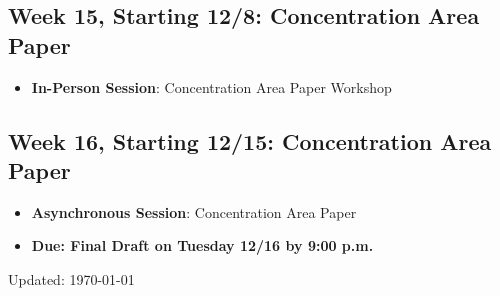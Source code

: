 \documentclass[12pt]{article}     %
\begin{document}
\subsection*{Week 15, Starting 12/8: Concentration Area Paper}
\begin{itemize}
    \item \textbf{In-Person Session}: Concentration Area Paper Workshop
\end{itemize}

\subsection*{Week 16, Starting 12/15: Concentration Area Paper}
\begin{itemize}
    \item \textbf{Asynchronous Session}: Concentration Area Paper
    \item \textbf{Due: Final Draft on Tuesday 12/16 by 9:00 p.m.}
\end{itemize}


\newpage


            \singlespace
            
            
\vspace{1cm}
\begin{flushright}
Updated: \today
\end{flushright}
\end{document}
